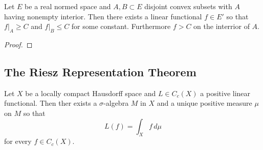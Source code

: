 \begin{theorem}\label{thm:separation}
    Let \( E \) be a real normed space and \( A, B \subset E \) disjoint convex subsets with \( A \)
    having nonempty interior. Then there exists a linear functional \( f \in E' \) so that \( f|_A \ge C \)
    and \( f|_B \le C \) for some constant. Furthermore \( f > C \) on the interrior of \( A \).

\end{theorem}

\begin{proof}
\end{proof}
\bigskip


\subsection{The Riesz Representation Theorem}
\bigskip

\begin{theorem}\label{thm:riesz_representation}
    Let \( X \) be a locally compact Hausdorff space and \( L \in C_c(X) \) a positive linear functional.
    Then ther exists a \( \sigma \)-algebra \( M \) in \( X \) and a unique positive measure
    \( \mu \) on \( M \) so that
    \[
        L(f) = \int_X f\,d\mu
    \]
    for every \( f \in C_c(X) \).
\end{theorem}
\bigskip

